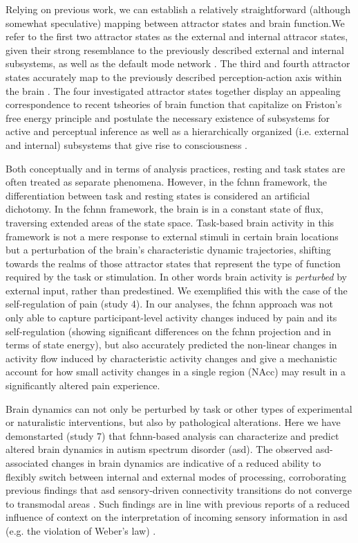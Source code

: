 \documentclass{article}
\begin{document}
Relying on previous work, we can establish a relatively straightforward (although somewhat speculative) mapping between attractor states and brain function.We refer to the first two attractor states as the external and internal attracor states, given their strong resemblance to the previously described external and internal subsystems, as well as the default mode network \citep{golland2008data, cioli2014differences}. The third and fourth attractor states accurately map to the previously described perception-action axis within the brain \citep{fuster2004upper}. The four investigated attractor states together display an appealing correspondence to recent tsheories of brain function that capitalize on Friston's free energy principle \citep{friston2006free} and postulate the necessary existence of subsystems for active and perceptual inference \citep{friston2023free} as well as a hierarchically organized (i.e. external and internal) subsystems that give rise to consciousness \citep{ramstead2023inner}.

Both conceptually and in terms of analysis practices, resting and task states are often treated as separate phenomena. However, in the \acrshort{fchnn} framework, the differentiation between task and resting states is considered an artificial dichotomy.
In the \acrshort{fchnn} framework, the brain is in a constant state of flux, traversing extended areas of the state space. Task-based brain activity in this framework is not a mere response to external stimuli in certain brain locations but a perturbation of the brain's characteristic dynamic trajectories, shifting towards the realms of those attractor states that represent the type of function required by the task or stimulation. In other words brain activity is \textit{perturbed} by external input, rather than predestined.
We exemplified this with the case of the self-regulation of pain (study 4).
In our analyses, the \acrshort{fchnn} approach was not only able to capture participant-level activity changes induced by pain and its self-regulation (showing significant differences on the \acrshort{fchnn} projection and in terms of state energy), but also accurately predicted the non-linear changes in activity flow induced by characteristic activity changes and give a mechanistic account for how small activity changes in a single region (NAcc) may result in a significantly altered pain experience.

Brain dynamics can not only be perturbed by task or other types of experimental or naturalistic interventions, but also by pathological alterations. Here we have demonstarted (study 7) that \acrshort{fchnn}-based analysis can characterize and predict altered brain dynamics in autism spectrum disorder (\acrshort{asd}). The observed \acrshort{asd}-associated changes in brain dynamics are indicative of a reduced ability to flexibly switch between internal and external modes of processing, corroborating previous findings that \acrshort{asd} sensory-driven connectivity transitions do not converge to transmodal areas \citep{hong2019atypical}. Such findings are in line with previous reports of a reduced influence of context on the interpretation of incoming sensory information in \acrshort{asd} (e.g. the violation of Weber's law) \citep{hadad2019perception}.
\end{document}

